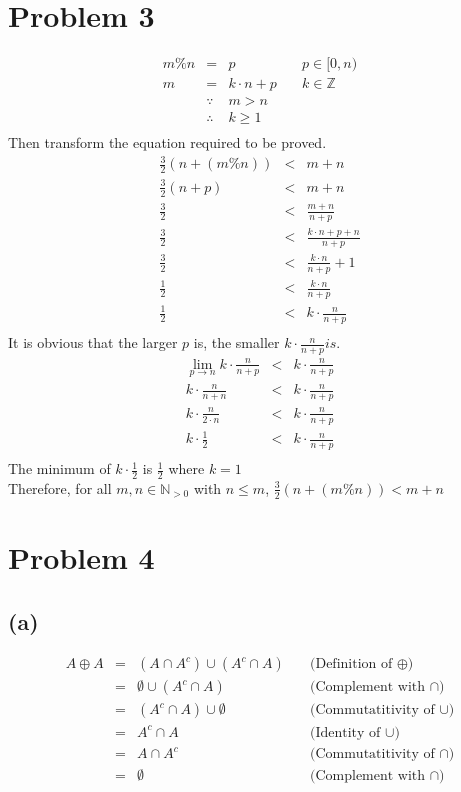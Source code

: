 \documentclass{article} %
\begin{document}
\section*{Problem 3}
\[\begin{array}{rclr}
m\% n &=&p &\quad\mbox{$p \in [0,n)$}\\
m&=&k\cdot n +p &\quad\mbox{$k\in \mathbb{Z}$}\\
&\because& m>n\\
&\therefore& k\geq 1\\
\end{array}\]
Then transform the equation required to be proved.
\[\begin{array}{rclr}
\frac{3}{2}(n+(m\%n))&<&m+n\\
\frac{3}{2}(n+p)&<&m+n\\
\frac{3}{2}&<&\frac{m+n}{n+p}\\
\frac{3}{2}&<&\frac{k\cdot n+p+n}{n+p}\\
\frac{3}{2}&<&\frac{k\cdot n}{n+p}+1\\
\frac{1}{2}&<&\frac{k\cdot n}{n+p}\\
\frac{1}{2}&<&k\cdot \frac{n}{n+p}\\
\end{array}\]
It is obvious that the larger $p$ is, the smaller $k\cdot \frac{n}{n+p} is$.
\[\begin{array}{rclr}
\lim\limits_{p\to n}k\cdot \frac{n}{n+p}&<&k\cdot \frac{n}{n+p}\\
k\cdot \frac{n}{n+n}&<&k\cdot \frac{n}{n+p}\\
k\cdot \frac{n}{2\cdot n}&<&k\cdot \frac{n}{n+p}\\
k\cdot \frac{1}{2}&<&k\cdot \frac{n}{n+p}\\
\end{array}\]
The minimum of $k\cdot \frac{1}{2}$ is $\frac{1}{2}$ where $k=1$\\ 
Therefore, for all $m,n\in \mathbb{N}_{>0}$ with $n \leq m$, $\frac{3}{2}(n+(m\%n))<m+n$\\

\section*{Problem 4}
\subsection*{(a)}
\[\begin{array}{rclr}
	A \oplus  A&=& (A \cap  A^{c} ) \cup  (A^{c}  \cap  A) &\quad\mbox{(Definition of $\oplus$)}\\
	&=& \emptyset  \cup  (A^{c}  \cap  A) &\quad\mbox{(Complement with $\cap$)}\\
	&=& (A^{c}  \cap  A) \cup  \emptyset  &\quad\mbox{(Commutatitivity of $\cup$)}\\
	&=& A^{c}  \cap  A &\quad\mbox{(Identity of $\cup$)}\\
	&=& A \cap  A^{c}  &\quad\mbox{(Commutatitivity of $\cap$)}\\
	&=& \emptyset  &\quad\mbox{(Complement with $\cap$)}
\end{array}\]
\end{document}
